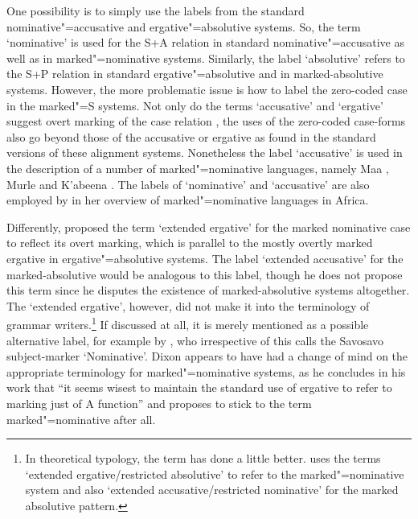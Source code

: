 One possibility is to simply use the labels from the standard nominative"=accusative and ergative"=absolutive systems.
So, the term `nominative' is used for the S+A relation in standard nominative"=accusative as well as in marked"=nominative systems. 
Similarly, the label `absolutive' refers to the S+P relation in standard ergative"=absolutive and in marked-absolutive systems. 
However, the more problematic issue is how to label the zero-coded case in the marked"=S systems.  
Not only do the terms `accusative' and `ergative' suggest overt marking of the case relation \citep[56--57]{Dixon:1994}, the uses of the zero-coded case-forms also go beyond those of the accusative or ergative as found in the standard versions of these alignment systems. 
Nonetheless the  label `accusative' is used in the description of a number of marked"=nominative languages, namely Maa , Murle \citep{Arensen:1982} and K'abeena \citep[85--86]{Crass:2005}. 
The labels of `nominative' and `accusative' are also employed by \citet{Koenig:2006,Koenig:2008} in her overview of marked"=nominative languages in Africa.

Differently, \citet{Dixon:1979} proposed the term `extended ergative' for the marked nominative case to reflect its overt marking, which is parallel to the mostly overtly marked ergative in ergative"=absolutive systems. 
The label `extended accusative' for the marked-absolutive would be analogous to this label, though he does not propose this term since he disputes the existence of marked-absolutive systems altogether. 
The `extended ergative', however, did not make it into the terminology of grammar writers.\footnote{In theoretical typology, the term has done a little better. 
\citet{Plank:1985} uses the terms `extended ergative/restricted absolutive' to refer to the marked"=nominative system and also `extended accusative/restricted nominative' for the marked absolutive pattern.} 
If discussed at all, it is merely mentioned as a possible alternative label, for example by \citet[133]{Wegener:2008}, who irrespective of this calls the Savosavo subject-marker `Nominative'. 
Dixon appears to have had a change of mind on the appropriate terminology for marked"=nominative systems, as he concludes in his \citeyear{Dixon:1994} work that ``it seems wisest to maintain the standard use of ergative to refer to marking just of A function'' \citep[64]{Dixon:1994} and proposes to stick to the term marked"=nominative after all.  

